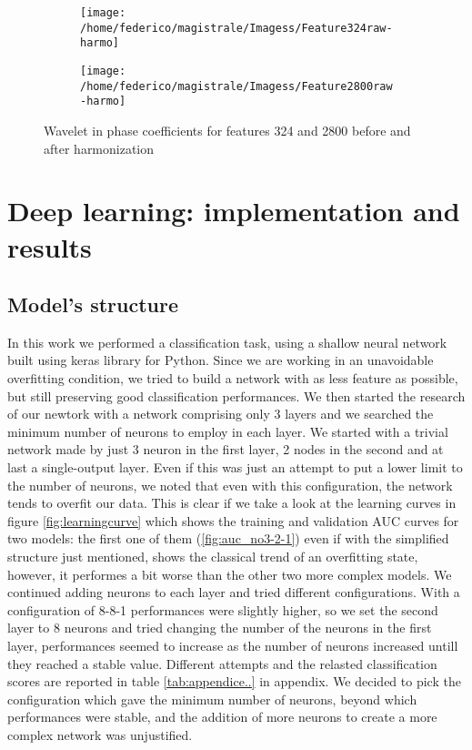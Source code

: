 \documentclass[a4paper,11pt]{article}
\begin{document}
 \begin{figure}
 \centering
 \begin{subfigure}[b]{1.\textwidth}
    \texttt{[image: /home/federico/magistrale/Imagess/Feature324raw-harmo]}
    \caption{}
    \label{fig:wavelet_feature324}
 \end{subfigure}
 \begin{subfigure}[b]{1.\textwidth}
    \texttt{[image: /home/federico/magistrale/Imagess/Feature2800raw-harmo]}
    \caption{}
    \label{fig:wavelet_feature2800}
 \end{subfigure}
 \caption{Wavelet in phase coefficients for features 324 and 2800 before and after harmonization}
 \label{fig:wavelet_features_raw-harmo}
 \end{figure}

\newpage
\section{Deep learning: implementation and results} \label{sec:deep_learning_results}
\subsection{Model's structure}
In this work we performed a classification task, using a shallow neural network built using keras library for Python.
Since we are working in an unavoidable overfitting condition, we tried to build a network with as less feature as possible, but still preserving good classification performances.
We then started the research of our newtork with a network comprising only 3 layers and we searched the minimum number of neurons to employ in each layer.
We started with a trivial network made by just 3 neuron in the first layer, 2 nodes in the second and at last a single-output layer. Even if this was just an attempt to put a lower limit to the number of neurons, we noted that even with this configuration, the network tends to overfit our data.
This is clear if we take a look at the learning curves in figure \ref{fig:learningcurve} which shows the training and validation AUC curves for two models: the first one of them (\ref{fig:auc_no3-2-1}) even if with the simplified structure just mentioned, shows the classical trend of an overfitting state, however, it performes a bit worse than the other two more complex models.
We continued adding neurons to each layer and tried different configurations. With a configuration of 8-8-1 performances were slightly higher, so we set the second layer to 8 neurons and tried changing the number of the neurons in the first layer, performances seemed to increase as the number of neurons increased untill they reached a stable value. Different attempts and the relasted classification scores are reported in table \ref{tab:appendice..} in appendix.
We decided to pick the configuration which gave the minimum number of neurons, beyond which performances were stable, and the addition of more neurons to create a more complex network was unjustified.
\end{document}
